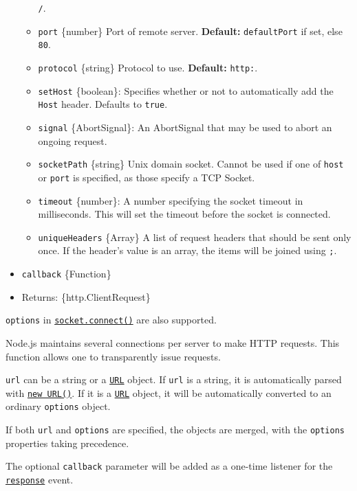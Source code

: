 \begin{itemize}
\begin{itemize}
    \texttt{\textquotesingle{}/\textquotesingle{}}.
  \item
    \texttt{port} \{number\} Port of remote server. \textbf{Default:}
    \texttt{defaultPort} if set, else \texttt{80}.
  \item
    \texttt{protocol} \{string\} Protocol to use. \textbf{Default:}
    \texttt{\textquotesingle{}http:\textquotesingle{}}.
  \item
    \texttt{setHost} \{boolean\}: Specifies whether or not to
    automatically add the \texttt{Host} header. Defaults to
    \texttt{true}.
  \item
    \texttt{signal} \{AbortSignal\}: An AbortSignal that may be used to
    abort an ongoing request.
  \item
    \texttt{socketPath} \{string\} Unix domain socket. Cannot be used if
    one of \texttt{host} or \texttt{port} is specified, as those specify
    a TCP Socket.
  \item
    \texttt{timeout} \{number\}: A number specifying the socket timeout
    in milliseconds. This will set the timeout before the socket is
    connected.
  \item
    \texttt{uniqueHeaders} \{Array\} A list of request headers that
    should be sent only once. If the header's value is an array, the
    items will be joined using \texttt{;}.
  \end{itemize}
\item
  \texttt{callback} \{Function\}
\item
  Returns: \{http.ClientRequest\}
\end{itemize}

\texttt{options} in
\href{net.md\#socketconnectoptions-connectlistener}{\texttt{socket.connect()}}
are also supported.

Node.js maintains several connections per server to make HTTP requests.
This function allows one to transparently issue requests.

\texttt{url} can be a string or a
\href{url.md\#the-whatwg-url-api}{\texttt{URL}} object. If \texttt{url}
is a string, it is automatically parsed with
\href{url.md\#new-urlinput-base}{\texttt{new\ URL()}}. If it is a
\href{url.md\#the-whatwg-url-api}{\texttt{URL}} object, it will be
automatically converted to an ordinary \texttt{options} object.

If both \texttt{url} and \texttt{options} are specified, the objects are
merged, with the \texttt{options} properties taking precedence.

The optional \texttt{callback} parameter will be added as a one-time
listener for the
\hyperref[event-response]{\texttt{\textquotesingle{}response\textquotesingle{}}}
event.

